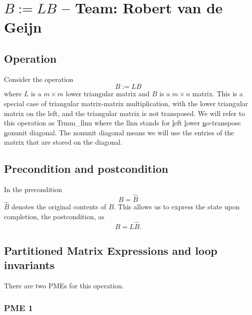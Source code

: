 \chapter{$ B := L B $ --  \large Team: Robert van de Geijn}



\section{Operation}

Consider the operation
\[
B := L B 
\]
where $ L $ is a $ m \times m $ lower triangular matrix and $ B $ is a $ m \times n $ matrix.
This is a special case of triangular 
matrix-matrix multiplication, 
with the {\sc l}ower triangular matrix on the {\sc left}, 
and the triangular matrix is {\sc n}ot transposed.
We will refer to this operation
as {\sc Trmm\_llnn} where the {\sc llnn} stands for
\underline{l}eft
\underline{l}ower
\underline{n}o-transpose
\underline{n}onunit diagonal.
The nonunit diagonal means we will use the entries of the matrix that are stored on the diagonal.

\section{Precondition and postcondition}

In the precondition 
\[
B = \widehat B
\]
$ \widehat B $ denotes the original contents of $ B $.
This allows us to express the state upon completion, the postcondition, as
\[
B = L \widehat B.
\]

\section{Partitioned Matrix Expressions and loop invariants}

There are two PMEs for this operation.

\subsection{PME 1}

